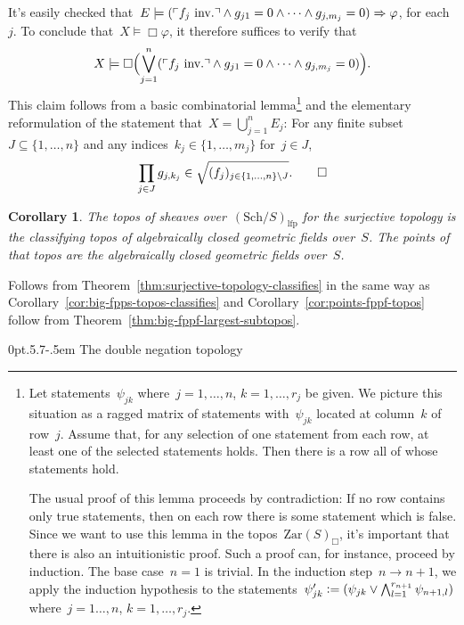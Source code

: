 \documentclass[10pt,reqno,a4paper]{amsbook}
\makeatletter
\theoremstyle{definition}
\theoremstyle{plain}
\newtheorem{cor}[defn]{Corollary}
\theoremstyle{remark}
\newcommand{\Zar}{\mathrm{Zar}}
\newcommand{\Sch}{\mathrm{Sch}}
\newcommand{\lfp}{\mathrm{lfp}}
\newcommand{\?}{\,{:}\,}
\renewcommand{\_}{\mathpunct{.}\,}
\newcommand{\speak}[1]{\ulcorner\text{\textnormal{#1}}\urcorner}
\newcommand{\inv}{inv.\@}
\newcommand{\defeq}{\vcentcolon=}
\renewenvironment{proof}[1][\proofname]{\par
  \pushQED{\qed}%
  \normalfont \topsep6\p@\@plus6\p@\relax
  \trivlist
  \item[\hskip\labelsep
        \itshape
    #1\@addpunct{.}]\ignorespaces
}{%
  \popQED\endtrivlist\@endpefalse
}
\def\subsection{\@startsection{subsection}{2}%
  {0pt}{.5\linespacing\@plus.7\linespacing}{-.5em}%
  {\normalfont\bfseries}}
\makeatother
\begin{document}
\begin{proof}
It's easily checked that~$E \models (\speak{$f_j$ \inv} \wedge g_{j1} = 0
\wedge \cdots \wedge g_{j,m_j} = 0) \Rightarrow \varphi$, for each~$j$. To
conclude that~$X \models \Box\varphi$, it therefore suffices to verify that
\[ X \models \Box\Bigl(\bigvee_{j=1}^n (\speak{$f_j$ \inv} \wedge
  g_{j1} = 0 \wedge \cdots \wedge g_{j,m_j} = 0)\Bigr). \]
This claim follows from a basic combinatorial lemma\footnote{Let
statements~$\psi_{jk}$ where~$j = 1,\ldots,n$, $k = 1,\ldots,r_j$ be given.
We picture this situation as a ragged matrix of statements with~$\psi_{jk}$ located
at column~$k$ of row~$j$. Assume that, for any selection of one statement from
each row, at least one of the selected statements holds. Then there is a row
all of whose statements hold.

The usual proof of this lemma proceeds by contradiction: If no row contains
only true statements, then on each row there is some statement which is false.
Since we want to use this lemma in the topos~$\Zar(S)_\Box$, it's important
that there is also an intuitionistic proof. Such a proof can, for
instance, proceed by induction. The base case~$n = 1$ is trivial. In the
induction step~$n \to n+1$, we apply the induction hypothesis to the
statements~$\psi_{jk}' \defeq (\psi_{jk} \vee \bigwedge_{l=1}^{r_{n+1}}
\psi_{n+1,l})$ where~$j=1\ldots,n$, $k=1,\ldots,r_j$.}
and the elementary reformulation of the statement that~$X = \bigcup_{j=1}^n
E_j$: For any finite subset~$J \subseteq \{1,\ldots,n\}$ and any indices~$k_j
\in \{ 1, \ldots, m_j \}$ for~$j \in J$,
\[ \prod_{j \in J} g_{j, k_j} \in \sqrt{(f_j)_{j \in \{1,\ldots,n\} \setminus J}}. \qedhere \]
\end{proof}

\begin{cor}The topos of sheaves over~$(\Sch/S)_\lfp$ for the surjective
topology is the classifying topos of algebraically closed geometric fields
over~$S$. The points of that topos are the algebraically closed geometric
fields over~$S$.\end{cor}

\begin{proof}Follows from Theorem~\ref{thm:surjective-topology-classifies} in
the same way as Corollary~\ref{cor:big-fpps-topos-classifies} and
Corollary~\ref{cor:points-fppf-topos} follow from
Theorem~\ref{thm:big-fppf-largest-subtopos}.
\end{proof}


\subsection{The double negation topology}
\end{document}
